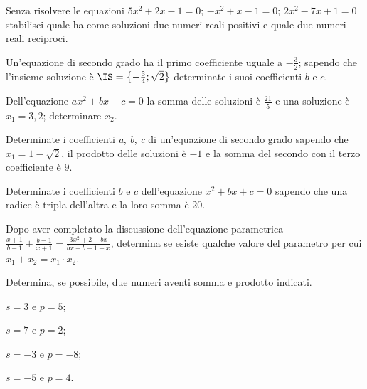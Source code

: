 \begin{esercizio}
 \label{ese:3.71}
Senza risolvere le equazioni $ 5 x^{2} + 2 x-1 = 0$; $-x^{2} + x-1 = 0$; $2 x^{2}-7 x +1 = 0$ stabilisci quale ha come soluzioni due numeri reali positivi e quale due numeri reali reciproci.
\end{esercizio}

\begin{esercizio}
 \label{ese:3.72}
Un’equazione di secondo grado ha il primo coefficiente uguale a $- \frac{3}{2}$; sapendo che l’insieme soluzione è $\IS = \left\{-\frac{3}{4};\sqrt{2} \right\}$
determinate i suoi coefficienti $b$ e $c$.
\end{esercizio}

\begin{esercizio}
 \label{ese:3.73}
Dell’equazione $a x^{2} + b x + c = 0$ la somma delle soluzioni è $\frac{21}{5}$ e una soluzione è $x_{1} = 3,2$; determinare $x_{2}$.
\end{esercizio}

\begin{esercizio}
 \label{ese:3.74}
Determinate i coefficienti \emph{a}, \emph{b}, \emph{c} di un’equazione di secondo grado sapendo che $x_{1} = 1-\sqrt{2}$, il prodotto delle soluzioni è $- 1$
e la somma del secondo con il terzo coefficiente è $9$.
\end{esercizio}

\begin{esercizio}
 \label{ese:3.75}
Determinate i coefficienti $b$ e $c$ dell’equazione $x^{2} + b x + c = 0$ sapendo che una radice è tripla dell’altra e la loro somma è 20.
\end{esercizio}

\begin{esercizio}[\Ast]
 \label{ese:3.76}
Dopo aver completato la discussione dell’equazione parametrica $\frac{x + 1}{b-1} + \frac{b-1}{x + 1}=\frac{3 x^{2} + 2-b x}{b x + b-1-x}$, determina se esiste qualche valore del parametro per cui $x_{1} + x_{2} = x_{1} \cdot x_{2}$.
\end{esercizio}

\begin{esercizio}
 \label{ese:3.77}
Determina, se possibile, due numeri aventi somma e prodotto indicati.
\begin{multicols}{2}
\begin{enumeratea}
\item $s = 3 \text{ e } p = 5$;
\item $s = 7 \text{ e } p = 2$;
\item $s =-3 \text{ e } p =-8$;
\item $s =-5 \text{ e } p = 4$.
\end{enumeratea}
\end{multicols}
\end{esercizio}

